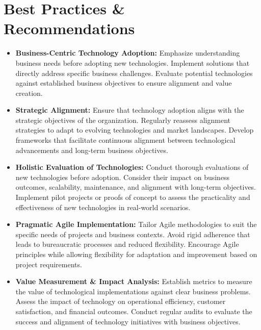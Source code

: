 \documentclass[a4Paper]{article}
\begin{document}
\section{Best Practices \& Recommendations}
\begin{itemize}
    \item \textbf{Business-Centric Technology Adoption:} \cite{ilmudeen2019does, al2020impact} Emphasize understanding business needs before adopting new technologies. Implement solutions that directly address specific business challenges. Evaluate potential technologies against established business objectives to ensure alignment and value creation.
    
    \item \textbf{Strategic Alignment:} \cite{ullah2011modeling} Ensure that technology adoption aligns with the strategic objectives of the organization. Regularly reassess alignment strategies to adapt to evolving technologies and market landscapes. Develop frameworks that facilitate continuous alignment between technological advancements and long-term business objectives.
    
    \item \textbf{Holistic Evaluation of Technologies:} \cite{dube2020review, al2020agile} Conduct thorough evaluations of new technologies before adoption. Consider their impact on business outcomes, scalability, maintenance, and alignment with long-term objectives. Implement pilot projects or proofs of concept to assess the practicality and effectiveness of new technologies in real-world scenarios.
    
    \item \textbf{Pragmatic Agile Implementation:} \cite{abrahamsson2017agile, hayat2019influence} Tailor Agile methodologies to suit the specific needs of projects and business contexts. Avoid rigid adherence that leads to bureaucratic processes and reduced flexibility. Encourage Agile principles while allowing flexibility for adaptation and improvement based on project requirements.
    
    \item \textbf{Value Measurement \& Impact Analysis:} \cite{al2020impact, anzoategui2019endogenous} Establish metrics to measure the value of technological implementations against clear business problems. Assess the impact of technology on operational efficiency, customer satisfaction, and financial outcomes. Conduct regular audits to evaluate the success and alignment of technology initiatives with business objectives.
    

\end{itemize}
\end{document}
